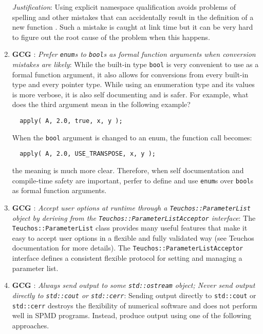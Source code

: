 \begin{enumerate}
{}\textit{Justification}: Using explicit namespace qualification avoids
problems of spelling and other mistakes that can accidentally result in the
definition of a new function {}\cite[Section 8.2]{stroustrup97}.  Such a
mistake is caught at link time but it can be very hard to figure out the root
cause of the problem when this happens.

{}\item{}\textbf{GCG }:
{}\textit{Prefer {}\texttt{enum}s to {}\texttt{bool}s as formal function
arguments when conversion mistakes are likely}: While the built-in type
{}\texttt{bool} is very convenient to use as a formal function argument, it
also allows for conversions from every built-in type and every pointer type.
While using an enumeration type and its values is more verbose, it is also
self documenting and is safer.  For example, what does the third argument mean
in the following example?

{\small\begin{verbatim}
  apply( A, 2.0, true, x, y );
\end{verbatim}}

When the {}\texttt{bool} argument is changed to an enum, the function call
becomes:

{\small\begin{verbatim}
  apply( A, 2.0, USE_TRANSPOSE, x, y );
\end{verbatim}}

the meaning is much more clear.  Therefore, when self documentation and
compile-time safety are important, perfer to define and use {}\texttt{enum}s
over {}\texttt{bool}s as formal function arguments.

{}\item{}\textbf{GCG }:
{}\textit{Accept user options at runtime through a
{}\texttt{Teuchos\-::Parameter\-List} object by deriving from the
{}\texttt{Teuchos\-::Parameter\-List\-Acceptor} interface}: The
{}\texttt{Teuchos\-::Parameter\-List} class provides many useful features that
make it easy to accept user options in a flexible and fully validated way (see
Teuchos documentation for more details).  The
{}\texttt{Teuchos\-::Parameter\-List\-Acceptor} interface defines a consistent
flexible protocol for setting and managing a parameter list.

{}\item{}\textbf{GCG }:
{}\textit{Always send output to some {}\texttt{std\-::ostream} object;
Never send output directly to {}\texttt{std\-::cout} or {}\texttt{std\-::cerr}}:
Sending output directly to {}\texttt{std\-::cout} or {}\texttt{std\-::cerr}
destroys the flexibility of numerical software and does not perform well in
SPMD programs.  Instead, produce output using one of the following approaches.


\end{enumerate}
